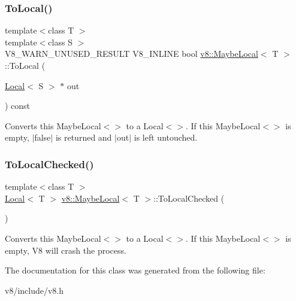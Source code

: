\subsubsection{\texorpdfstring{To\+Local()}{ToLocal()}}
{\footnotesize\ttfamily template$<$class T $>$ \\
template$<$class S $>$ \\
V8\+\_\+\+W\+A\+R\+N\+\_\+\+U\+N\+U\+S\+E\+D\+\_\+\+R\+E\+S\+U\+LT V8\+\_\+\+I\+N\+L\+I\+NE bool \mbox{\hyperlink{classv8_1_1MaybeLocal}{v8\+::\+Maybe\+Local}}$<$ T $>$\+::To\+Local (\begin{DoxyParamCaption}\item[{\mbox{\hyperlink{classv8_1_1Local}{Local}}$<$ S $>$ $\ast$}]{out }\end{DoxyParamCaption}) const\hspace{0.3cm}{\ttfamily [inline]}}

Converts this Maybe\+Local$<$$>$ to a Local$<$$>$. If this Maybe\+Local$<$$>$ is empty, $\vert$false$\vert$ is returned and $\vert$out$\vert$ is left untouched. \mbox{\label{classv8_1_1MaybeLocal_a9b2c9d50fca5897e3a03fd4c25d12415}} 
\subsubsection{\texorpdfstring{To\+Local\+Checked()}{ToLocalChecked()}}
{\footnotesize\ttfamily template$<$class T $>$ \\
\mbox{\hyperlink{classv8_1_1Local}{Local}}$<$ T $>$ \mbox{\hyperlink{classv8_1_1MaybeLocal}{v8\+::\+Maybe\+Local}}$<$ T $>$\+::To\+Local\+Checked (\begin{DoxyParamCaption}{ }\end{DoxyParamCaption})}

Converts this Maybe\+Local$<$$>$ to a Local$<$$>$. If this Maybe\+Local$<$$>$ is empty, V8 will crash the process. 

The documentation for this class was generated from the following file\+:\begin{DoxyCompactItemize}
\item 
v8/include/v8.\+h\end{DoxyCompactItemize}
